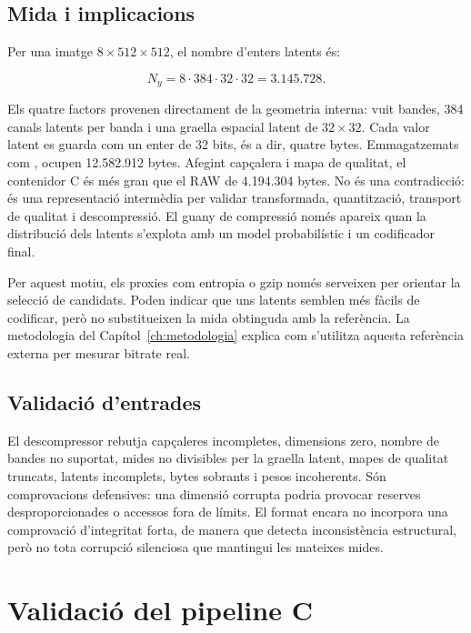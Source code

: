 \subsection{Mida i implicacions}

Per una imatge $8\times512\times512$, el nombre d'enters latents és:

\begin{equation}
N_y=8\cdot384\cdot32\cdot32=3.145.728.
\end{equation}

Els quatre factors provenen directament de la geometria interna: vuit bandes,
384 canals latents per banda i una graella espacial latent de $32\times32$.
Cada valor latent es guarda com un enter de 32 bits, és a dir, quatre bytes.
Emmagatzemats com , ocupen 12.582.912 bytes. Afegint capçalera i
mapa de qualitat, el contenidor C és més gran que el RAW de 4.194.304 bytes.
No és una contradicció: és una representació intermèdia per validar
transformada, quantització, transport de qualitat i descompressió. El guany de
compressió només apareix quan la distribució dels latents s'explota amb un
model probabilístic i un codificador final.

Per aquest motiu, els proxies com entropia o gzip només serveixen per orientar
la selecció de candidats. Poden indicar que uns latents semblen més fàcils de
codificar, però no substitueixen la mida  obtinguda amb la
referència. La metodologia del Capítol~\ref{ch:metodologia} explica com
s'utilitza aquesta referència externa per mesurar bitrate real.

\subsection{Validació d'entrades}\label{sec:decoder_c}

El descompressor rebutja capçaleres incompletes, dimensions zero, nombre de
bandes no suportat, mides no divisibles per la graella latent, mapes de
qualitat truncats, latents incomplets, bytes sobrants i pesos incoherents. Són
comprovacions defensives: una dimensió corrupta podria provocar reserves
desproporcionades o accessos fora de límits. El format encara no incorpora una
comprovació d'integritat forta, de manera que detecta inconsistència
estructural, però no tota corrupció silenciosa que mantingui les mateixes mides.

\section{Validació del pipeline C}\label{sec:tests_c}

